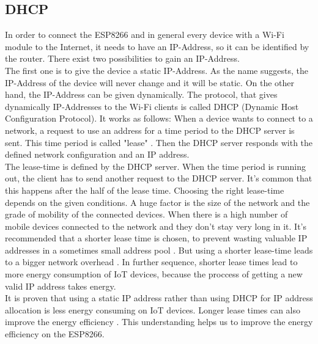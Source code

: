 \subsection{DHCP}
In order to connect the ESP8266 and in general every device with a Wi-Fi module to the Internet, it needs to have an IP-Address, so it can be identified by the router. 
There exist two possibilities to gain an IP-Address.\\ The first one is to give the device a static IP-Address. As the name suggests, the IP-Address of the device will never change and it will be static. On the other hand, the IP-Address can be given dynamically.
The protocol, that gives dynamically IP-Addresses to the Wi-Fi clients is called DHCP (Dynamic Host Configuration Protocol).
It works as follows: When a device wants to connect to a network, a request to use an address for a time period to the DHCP server is sent. This time period is called "lease" \cite{droms1997rfc2131}. Then the DHCP server responds with the defined network configuration and an IP address.\\
The lease-time is defined by the DHCP server. When the time period is running out, the client has to send another request to the DHCP server. It's common that this happens after the half of the lease time.
Choosing the right lease-time depends on the given conditions. A huge factor is the size of the network and the grade of mobility of the connected devices. When there is a high number of mobile devices connected to the network and they don't stay very long in it. It's recommended that a shorter lease time is chosen, to prevent wasting valuable IP addresses in a sometimes small address pool \cite{khadilkar2007usage}.
But using a shorter lease-time leads to a bigger network overhead \cite{li_how_2018}. In further sequence, shorter lease times lead to more energy consumption of IoT devices, because the proccess of getting a new valid IP address takes energy.\\
It is proven that using a static IP address rather than using DHCP for IP address allocation is less energy consuming on IoT devices. Longer lease times can also improve the energy efficiency \cite{department_of_computer_engineering_mehmet_akif_ersoy_university_faculty_of_engineering_and_architecture_burdur_turkey_power_2020}. This understanding helps us to improve the energy efficiency on the ESP8266.



